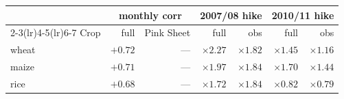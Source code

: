 \begin{tabular}{l rr rr rr}
\toprule
 & \multicolumn{2}{c}{monthly corr} & \multicolumn{2}{c}{2007/08 hike} & \multicolumn{2}{c}{2010/11 hike} \\
\cmidrule(lr){2-3}\cmidrule(lr){4-5}\cmidrule(lr){6-7}
Crop & full & Pink Sheet & full & obs & full & obs \\
\midrule
wheat & $+0.72$ & --- & $\times 2.27$ & $\times 1.82$ & $\times 1.45$ & $\times 1.16$ \\
maize & $+0.71$ & --- & $\times 1.97$ & $\times 1.84$ & $\times 1.70$ & $\times 1.44$ \\
rice  & $+0.68$ & --- & $\times 1.72$ & $\times 1.84$ & $\times 0.82$ & $\times 0.79$ \\
\bottomrule
\end{tabular}
